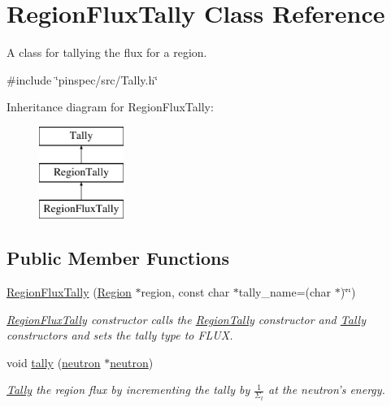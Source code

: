 \hypertarget{classRegionFluxTally}{\section{Region\-Flux\-Tally Class Reference}
\label{classRegionFluxTally}
}


A class for tallying the flux for a region.  




{\ttfamily \#include \char`\"{}pinspec/src/\-Tally.\-h\char`\"{}}

Inheritance diagram for Region\-Flux\-Tally\-:\begin{figure}[H]
\begin{center}
\leavevmode
\includegraphics[height=3.000000cm]{classRegionFluxTally}
\end{center}
\end{figure}
\subsection*{Public Member Functions}
\begin{DoxyCompactItemize}
\item 
\hyperlink{classRegionFluxTally_afeb527c4b8deafc6cff68594ad95a9c8}{Region\-Flux\-Tally} (\hyperlink{classRegion}{Region} $\ast$region, const char $\ast$tally\-\_\-name=(char $\ast$)\char`\"{}\char`\"{})
\begin{DoxyCompactList}\small\item\em \hyperlink{classRegionFluxTally}{Region\-Flux\-Tally} constructor calls the \hyperlink{classRegionTally}{Region\-Tally} constructor and \hyperlink{classTally}{Tally} constructors and sets the tally type to F\-L\-U\-X. \end{DoxyCompactList}\item 
void \hyperlink{classRegionFluxTally_a318a32edcb4f2866574194cd74ddd04f}{tally} (\hyperlink{structneutron}{neutron} $\ast$\hyperlink{structneutron}{neutron})
\begin{DoxyCompactList}\small\item\em \hyperlink{classTally}{Tally} the region flux by incrementing the tally by $ \frac{1}{\Sigma_t} $ at the neutron's energy. \end{DoxyCompactList}\end{DoxyCompactItemize}
